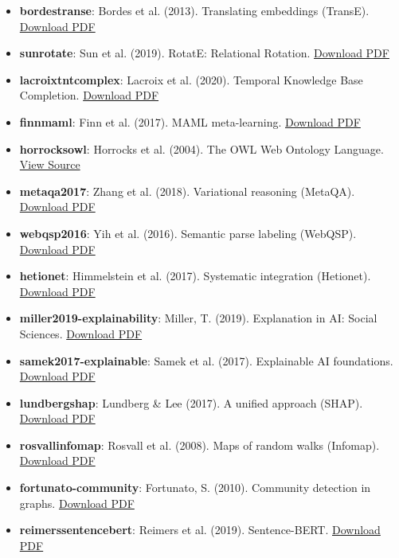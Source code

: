 \documentclass[10pt,journal,compsoc]{IEEEtran}
\begin{document}
\begin{itemize}
\item \textbf{bordes\-transe}: Bordes et al. (2013). Translating embeddings (TransE). \href{https://papers.nips.cc/paper/5071-translating-embeddings-for-modeling-multi-relational-data.pdf}{Download PDF}
\item \textbf{sun\-rotate}: Sun et al. (2019). RotatE: Relational Rotation. \href{https://arxiv.org/pdf/1902.10197.pdf}{Download PDF}
\item \textbf{lacroix\-tntco\-mplex}: Lacroix et al. (2020). Temporal Knowledge Base Completion. \href{https://openreview.net/pdf?id=Hye_S0NKvB}{Download PDF}
\item \textbf{finn\-maml}: Finn et al. (2017). MAML meta-learning. \href{https://arxiv.org/pdf/1703.03400.pdf}{Download PDF}
\item \textbf{horrocks\-owl}: Horrocks et al. (2004). The OWL Web Ontology Language. \href{https://www.w3.org/TR/owl-features/}{View Source}
\item \textbf{metaqa2017}: Zhang et al. (2018). Variational reasoning (MetaQA). \href{https://arxiv.org/pdf/1709.04071.pdf}{Download PDF}
\item \textbf{webqsp2016}: Yih et al. (2016). Semantic parse labeling (WebQSP). \href{https://aclanthology.org/P16-2033.pdf}{Download PDF}
\item \textbf{hetionet\-}: Himmelstein et al. (2017). Systematic integration (Hetionet). \href{https://elifesciences.org/articles/26726.pdf}{Download PDF}
\item \textbf{miller2019-expla\-inability}: Miller, T. (2019). Explanation in AI: Social Sciences. \href{https://arxiv.org/pdf/1706.07269.pdf}{Download PDF}
\item \textbf{samek2017-explainable}: Samek et al. (2017). Explainable AI foundations. \href{https://arxiv.org/pdf/1708.08296.pdf}{Download PDF}
\item \textbf{lundberg\-shap}: Lundberg \& Lee (2017). A unified approach (SHAP). \href{https://papers.nips.cc/paper/7062-a-unified-approach-to-interpreting-model-predictions.pdf}{Download PDF}
\item \textbf{rosvall\-infomap}: Rosvall et al. (2008). Maps of random walks (Infomap). \href{https://www.pnas.org/content/pnas/105/4/1118.full.pdf}{Download PDF}
\item \textbf{fortunato\--community}: Fortunato, S. (2010). Community detection in graphs. \href{https://arxiv.org/pdf/0906.0612.pdf}{Download PDF}
\item \textbf{reimers\-sente\-ncebert}: Reimers et al. (2019). Sentence-BERT. \href{https://arxiv.org/pdf/1908.10084.pdf}{Download PDF}

\end{itemize}
\end{document}
